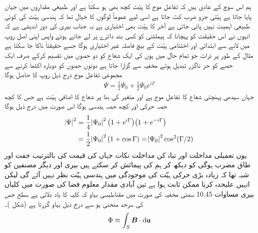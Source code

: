  ہم اس سوچ کے عادی ہیں کہ تفاعل موج کا ہیّت کچھ بھی ہو سکتا ہے اور طبیعی مقداروں میں جہاں  پایا جاتا ہے ہیّتی جزو ضرب کٹ جاتا ہے اسی لیے عموماً لوگوں کا خیال تھا کہ ہندسی ہیّت کی کوئی طبیعی اہمیت نہیں پائی جاتی ہے آخر  کا ہیّت بھی اختیاری ہے یہ جناب بیری کی دور اندیشی ہے کہ انہوں نے اس حقیقت کو پہچانا کہ ہیملٹنی کو کسی بند دائرے پر لے جاتے ہوئے واپس اپنی اصل روپ میں لانے سے ابتدائی اور اختتامی  ہیّت کے بیچ فاصلہ غیر اختیاری ہوگا جسے حقیقتاً ناکا جا سکتا ہے مثال کے طور پر ذرات جو تمام حال  میں ہوں کی ایک شعاع کو دو حصوں میں تقسیم کرکے صرف ایک حصے کو حر ناگزر تبدیل ہوتے مخفیہ سے گزارا جاتا ہے دونوں حصوں کو دوبارہ اکٹھا کرنے سے مجموعی تفاعل موج درج ذیل روپ کا حاصل ہوگا 
\begin{align}
\Psi = \frac{1}{2} \Psi_0 + \frac{1}{2} \Psi_0 e^{i \Gamma}
\end{align}
جہاں سیدھی پہنچتی شعاع کا تفاعل موج  ہے اور متغیر  کی بنا پر شعاع کا اضافی ہیّت  ہے جس کا کچھ حصہ حرکی اور کچھ حصہ ہندسی ہوگا اس صورت میں درج ذیل ہوگا 
\begin{align}
\abs{\Psi}^2 &= \frac{1}{4} \abs{\Psi_0}^2 \big ( 1 + e^{i \Gamma} \big ) \big ( 1 + e^{- i \Gamma} \big ) \\
&= \frac{1}{2} \abs{\Psi_0}^2 (1 + \cos \Gamma) = \abs{\Psi_0}^2 \cos^2 (\Gamma/2)
\end{align}
یوں تعمیلی مداخلت اور تباہ کن مداخلت نکات جہاں  کی قیمت  کی بالترتیب جفت اور طاق مضرب ہوگی کو دیکھ کر ہم  کی پیمائش کر سکتے ہیں بیری اور دیگر مصنفین کو شبہ تھا کہ زیادہ بڑی حرکی ہیّت کی موجودگی میں ہندسی  ہیّت  نظر نہیں آئے گی لیکن انہیں علیحدہ کرنا ممکن ثابت ہوا ہے تین آبادی مقدار معلوم فضا  کی صورت میں کلیاں بیری مساوات 10.45 سمتی مخفیہ  کی صورت میں مقناطیسی بہاو  کہ کلیہ کا یاد دلاتی ہے سطح  جس کی سرحد منحنی  ہو سے درج ذیل
 بہاو گزرتا ہے  (شکل )۔ 
\begin{align}
\Phi \equiv \int_S \kvec{B} \cdot \dif \kvec{a}
\end{align}

